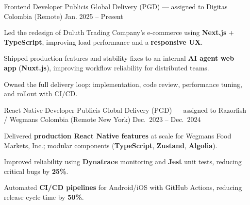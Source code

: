 \newcommand{\quotes}[1]{``#1''}

\begin{cventries}

  \cventry
  {Frontend Developer}
  {Publicis Global Delivery (PGD) — assigned to Digitas}
  {Colombia (Remote)}
  {Jan. 2025 -- Present}
  {
    \begin{cvitems}
      \item {Led the redesign of Duluth Trading Company's e-commerce using \textbf{Next.js} + \textbf{TypeScript}, improving load performance and a \textbf{responsive UX}.}
      \item {Shipped production features and stability fixes to an internal \textbf{AI agent web app} (\textbf{Nuxt.js}), improving workflow reliability for distributed teams.}
      \item {Owned the full delivery loop: implementation, code review, performance tuning, and rollout with CI/CD.}
    \end{cvitems}
  }

  \cventry
  {React Native Developer}
  {Publicis Global Delivery (PGD) — assigned to Razorfish / Wegmans}
  {Colombia (Remote \textemdash{} New York)}
  {Dec.\ 2023 -- Dec.\ 2024}
  {
    \begin{cvitems}
      \item {Delivered \textbf{production React Native features} at scale for Wegmans Food Markets, Inc.; modular components (\textbf{TypeScript}, \textbf{Zustand}, \textbf{Algolia}).}
      \item {Improved reliability using \textbf{Dynatrace} monitoring and \textbf{Jest} unit tests, reducing critical bugs by \textbf{25\%}.}
      \item {Automated \textbf{CI/CD pipelines} for Android/iOS with GitHub Actions, reducing release cycle time by \textbf{50\%}.}
    \end{cvitems}
  }


\end{cventries}
